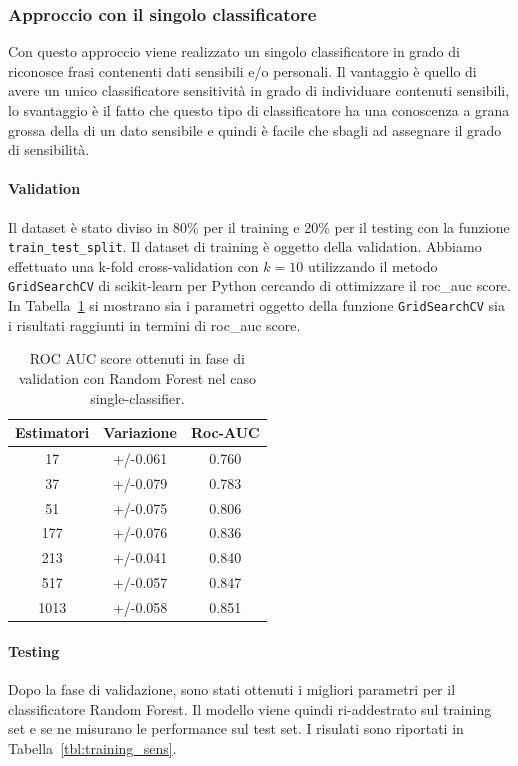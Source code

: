 \subsubsection{Approccio con il singolo classificatore}
\label{sssec:singleclass}
Con questo approccio viene realizzato un singolo classificatore in grado di riconosce frasi contenenti dati sensibili e/o personali. Il vantaggio è quello di avere un unico classificatore sensitività in grado di individuare contenuti sensibili, lo svantaggio è il fatto che questo tipo di classificatore ha una conoscenza a grana grossa della di un dato sensibile e quindi è facile che sbagli ad assegnare il grado di sensibilità.

\paragraph{Validation} Il dataset è stato diviso in 80\% per il training e 20\% per il testing con la funzione {\tt train\_test\_split}. Il dataset di training è oggetto della validation. Abbiamo effettuato una k-fold cross-validation con $k=10$ utilizzando il metodo {\tt GridSearchCV} di scikit-learn per Python cercando di ottimizzare il roc\_auc score. In Tabella~\ref{tbl:validation_sens} si mostrano sia i parametri oggetto della funzione {\tt GridSearchCV} sia i risultati raggiunti in termini di roc\_auc score. 
\begin{table}[h]
\centering
\begin{tabular}{|c|c|c|}
\hline
\textbf{Estimatori} & \textbf{Variazione} & \textbf{Roc-AUC} \\ \hline
17 & +/-0.061 & 0.760 \\ \hline
37 & +/-0.079 & 0.783 \\ \hline
51 & +/-0.075 & 0.806 \\ \hline
177 & +/-0.076 & 0.836 \\ \hline
213 & +/-0.041 & 0.840 \\ \hline
517 & +/-0.057 & 0.847 \\ \hline
1013 & +/-0.058 & 0.851 \\ \hline
\end{tabular}
\caption{ROC AUC score ottenuti in fase di validation con Random Forest nel caso single-classifier.}
\label{tbl:validation_sens}
\end{table}
\FloatBarrier

\paragraph{Testing} Dopo la fase di validazione, sono stati ottenuti i migliori parametri per il classificatore Random Forest. Il modello viene quindi ri-addestrato sul training set e se ne misurano le performance sul test set. I risulati sono riportati in Tabella~\ref{tbl:training_sens}.

